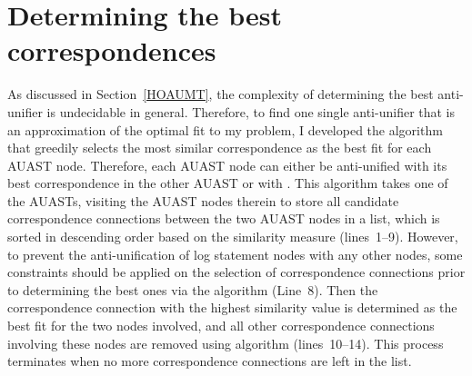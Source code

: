 







\section{Determining the best correspondences}  \label{best-corr}


As discussed in Section~\ref{HOAUMT}, the complexity of determining the best anti-unifier is undecidable in general. Therefore, to find one single anti-unifier that is an approximation of the optimal fit to my problem, I developed the  algorithm that greedily selects the most similar correspondence as the best fit for each AUAST node. Therefore, each AUAST node can either be anti-unified with its best correspondence in the other AUAST or with \nothing. This algorithm takes one of the AUASTs, visiting the AUAST nodes therein to store all candidate correspondence connections between the two AUAST nodes in a list, which is sorted in descending order based on the similarity measure (lines~1--9). However, to prevent the anti-unification of log statement nodes with any other nodes, some constraints should be applied on the selection of correspondence connections prior to determining the best ones via the  algorithm (Line~8). Then the correspondence connection with the highest similarity value is determined as the best fit for the two nodes involved, and all other correspondence connections involving these nodes are removed using  algorithm (lines~10--14). This process terminates when no more correspondence connections are left in the list.

